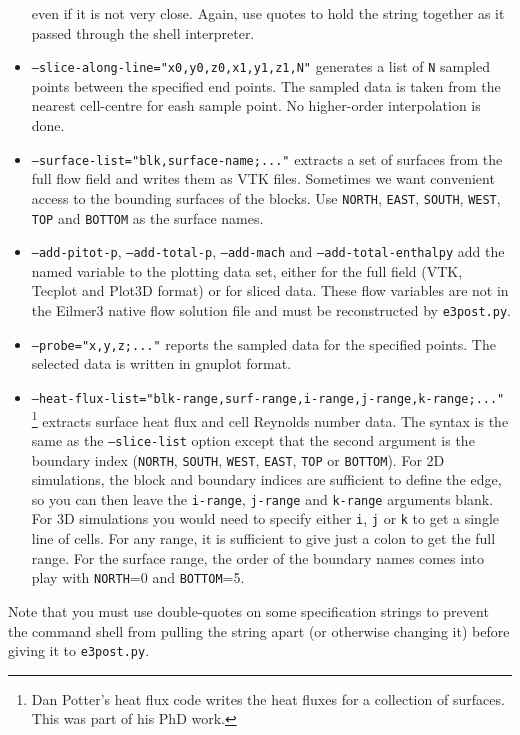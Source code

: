 \documentclass[12pt,a4paper,twoside]{article}
\begin{document}
\begin{itemize}
     even if it is not very close.
     Again, use quotes to hold the string together as it passed through the shell interpreter.
  \item \texttt{--slice-along-line="x0,y0,z0,x1,y1,z1,N"} generates a list of \texttt{N} sampled points between
     the specified end points.
     The sampled data is taken from the nearest cell-centre for eash sample point.
     No higher-order interpolation is done.
  \item \texttt{--surface-list="blk,surface-name;..."} extracts a set of surfaces from the full flow field and 
     writes them as VTK files.  
     Sometimes we want convenient access to the bounding surfaces of the blocks.
     Use \texttt{NORTH}, \texttt{EAST}, \texttt{SOUTH}, \texttt{WEST}, \texttt{TOP} and \texttt{BOTTOM} 
     as the surface names.
  \item \texttt{--add-pitot-p}, \texttt{--add-total-p}, \texttt{--add-mach} and \texttt{--add-total-enthalpy} add the
     named variable to the plotting data set, either for the full field (VTK, Tecplot and Plot3D format) or for sliced data.
     These flow variables are not in the Eilmer3 native flow solution file and must be reconstructed by \texttt{e3post.py}.
  \item \texttt{--probe="x,y,z;..."} reports the sampled data for the specified points.
     The selected data is written in gnuplot format.
  \item \texttt{--heat-flux-list="blk-range,surf-range,i-range,j-range,k-range;..."}\,\footnote{Dan Potter's heat flux code writes
     the heat fluxes for a collection of surfaces.  This was part of his PhD work.} extracts surface heat flux and cell Reynolds number data.
     The syntax is the same as the \texttt{--slice-list} option except that the second argument is the boundary index 
     (\texttt{NORTH}, \texttt{SOUTH}, \texttt{WEST}, \texttt{EAST}, \texttt{TOP} or \texttt{BOTTOM}).
     For 2D simulations, the block and boundary indices are sufficient to define the edge, 
     so you can then leave the \texttt{i-range}, \texttt{j-range} and \texttt{k-range} arguments blank.
     For 3D simulations you would need to specify either \texttt{i}, \texttt{j} or \texttt{k} to get a single line of cells.
     For any range, it is sufficient to give just a colon to get the full range.
     For the surface range, the order of the boundary names comes into play with \texttt{NORTH}=0 and \texttt{BOTTOM}=5.
\end{itemize}
Note that you must use double-quotes on some specification strings to prevent the command shell 
from pulling the string apart (or otherwise changing it) before giving it to \texttt{e3post.py}.
\end{document}
